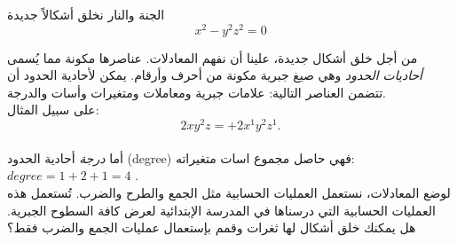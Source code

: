 \begin{surferPage}{الجنة والنار}
نخلق أشكالاً جديدة \\
\smallskip
\[x^2	- y^2z^2	= 0\]

\singlespacing
من أجل خلق أشكال جديدة، علينا أن نفهم المعادلات. عناصرها مكونة مما يُسمى \textit{أحاديات الحدود} وهي صيغ جبرية مكونة من أحرف وأرقام.
\singlespacing
يمكن لأحادية الحدود أن تتضمن العناصر التالية:
علامات جبرية ومعاملات ومتغيرات وأسات والدرجة.\\
\singlespacing
على سبيل المثال:
\smallskip
\[2xy^2z = +2x^1y^2z^1.\]
\\
\smallskip
 أما\textit{ درجة} أحادية الحدود \textenglish{(degree)} فهي حاصل مجموع اسات متغيراته: $degree = 1+2+1=4$ .  \\
\singlespacing
لوضع المعادلات، نستعمل العمليات الحسابية مثل الجمع والطرح والضرب. تُستعمل هذه العمليات الحسابية التي درسناها في المدرسة الإبتدائية لعرض كافة السطوح الجبرية.
\singlespacing
هل يمكنك خلق أشكال لها ثغرات وقمم بإستعمال عمليات الجمع والضرب فقط؟
\end{surferPage}
